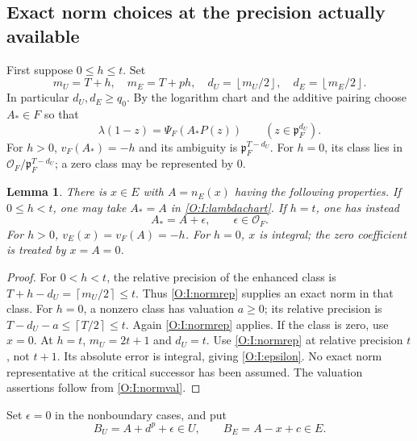 \documentclass[11pt]{amsart}
\newtheorem{lemma}[theorem]{Lemma}
\theoremstyle{definition}
\theoremstyle{remark}
\newcommand{\ceil}[1]{\left\lceil #1\right\rceil}
\newcommand{\floor}[1]{\left\lfloor #1\right\rfloor}
\newcommand{\OO}{\mathcal O}\newcommand{\pp}{\mathfrak p}\newcommand{\PP}{\mathfrak P}
\begin{document}
\subsection{Exact norm choices at the precision actually available}
First suppose $0\le h\le t$. Set
\[
 m_U=T+h,\quad m_E=T+ph,\quad
 d_U=\floor{m_U/2},\quad d_E=\floor{m_E/2}.
\]
In particular $d_U,d_E\ge q_0$.
By the logarithm chart and the additive pairing choose $A_*\in F$ so that
\begin{equation}\label{O:I:lambdachart}
 \lambda(1-z)=\Psi_F(A_*P(z))\qquad(z\in\pp_F^{d_U}).
\end{equation}
For $h>0$, $v_F(A_*)=-h$ and its ambiguity is $\pp_F^{T-d_U}$.
For $h=0$, its class lies in $\OO_F/\pp_F^{T-d_U}$; a zero class may be
represented by $0$.

\begin{lemma}\label{O:I:chooseA}
There is $x\in E$ with $A=n_E(x)$ having the following properties.
If $0\le h<t$, one may take $A_*=A$ in \eqref{O:I:lambdachart}.
If $h=t$, one has instead
\begin{equation}\label{O:I:epsilon}
 A_*=A+\epsilon,\qquad\epsilon\in\OO_F.
\end{equation}
For $h>0$, $v_E(x)=v_F(A)=-h$. For $h=0$, $x$ is integral; the zero
coefficient is treated by $x=A=0$.
\end{lemma}
\begin{proof}
For $0<h<t$, the relative precision of the enhanced class is
$T+h-d_U=\ceil{m_U/2}\le t$. Thus \eqref{O:I:normrep} supplies an exact
norm in that class. For $h=0$, a nonzero class has valuation $a\ge0$;
its relative precision is $T-d_U-a\le\ceil{T/2}\le t$.
Again \eqref{O:I:normrep} applies. If the class is zero, use $x=0$.
At $h=t$, $m_U=2t+1$ and $d_U=t$. Use \eqref{O:I:normrep} at relative
precision $t$, not $t+1$. Its absolute error is integral, giving
\eqref{O:I:epsilon}. No exact norm representative at the critical successor
has been assumed. The valuation assertions follow from \eqref{O:I:normval}.
\end{proof}
Set $\epsilon=0$ in the nonboundary cases, and put
\begin{equation}\label{O:I:coefficients}
 B_U=A+d^p+\epsilon\in U,\qquad B_E=A-x+c\in E.
\end{equation}
\end{document}
